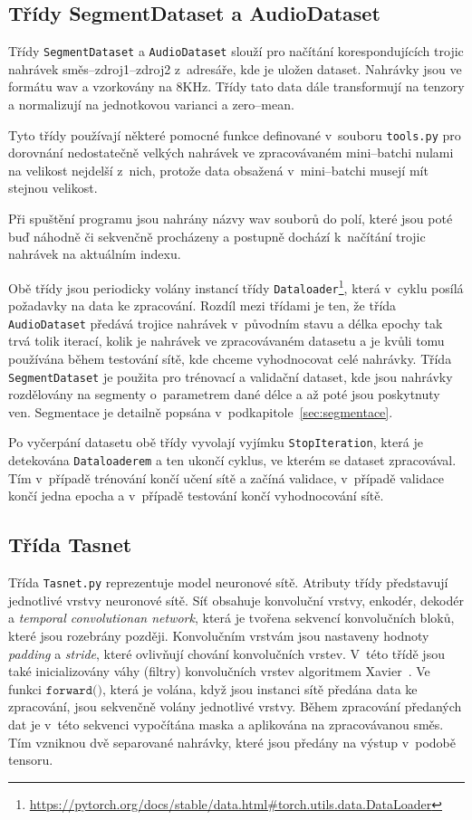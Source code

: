 \subsection*{Třídy SegmentDataset a AudioDataset}
Třídy \texttt{SegmentDataset} a \texttt{AudioDataset} slouží pro načítání korespondujících trojic nahrávek směs--zdroj1--zdroj2 z~adresáře, kde je uložen dataset. Nahrávky jsou ve formátu wav a vzorkovány na 8KHz. Třídy tato data dále transformují na tenzory a normalizují na jednotkovou varianci a zero--mean. 

Tyto třídy používají některé pomocné funkce definované v~souboru \texttt{tools.py} pro dorovnání nedostatečně velkých nahrávek ve zpracovávaném mini--batchi nulami na velikost nejdelší z~nich, protože data obsažená v~mini--batchi musejí mít stejnou velikost.

Při spuštění programu jsou nahrány názvy wav souborů do polí, které jsou poté buď náhodně či sekvenčně procházeny a postupně dochází k~načítání trojic nahrávek na aktuálním indexu. 

Obě třídy jsou periodicky volány instancí třídy \texttt{Dataloader}\footnote{\url{https://pytorch.org/docs/stable/data.html\#torch.utils.data.DataLoader}}, která v~cyklu posílá požadavky na data ke zpracování. Rozdíl mezi třídami je ten, že třída \texttt{AudioDataset} předává trojice nahrávek v~původním stavu a délka epochy tak trvá tolik iterací, kolik je nahrávek ve zpracovávaném datasetu a je kvůli tomu používána během testování sítě, kde chceme vyhodnocovat celé nahrávky. Třída \texttt{SegmentDataset} je použita pro trénovací a validační dataset, kde jsou nahrávky rozdělovány na segmenty o~parametrem dané délce a až poté jsou poskytnuty ven. Segmentace je detailně popsána v~podkapitole~\ref{sec:segmentace}.

Po vyčerpání datasetu obě třídy vyvolají vyjímku \texttt{StopIteration}, která je detekována \texttt{Dataloaderem} a ten ukončí cyklus, ve kterém se dataset zpracovával. Tím v~případě trénování končí učení sítě a začíná validace, v~případě validace končí jedna epocha a v~případě testování končí vyhodnocování sítě.


\subsection*{Třída Tasnet}
Třída \texttt{Tasnet.py} reprezentuje model neuronové sítě. Atributy třídy představují jednotlivé vrstvy neuronové sítě. Síť obsahuje konvoluční vrstvy, enkodér, dekodér a \textit{temporal convolutionan network}, která je tvořena sekvencí konvolučních bloků, které jsou rozebrány později. Konvolučním vrstvám jsou nastaveny hodnoty \textit{padding} a \textit{stride}, které ovlivňují chování konvolučních vrstev. V~této třídě jsou také inicializovány váhy (filtry) konvolučních vrstev algoritmem Xavier~\cite{pmlr-v9-glorot10a}. Ve funkci $\texttt{forward()}$, která je volána, když jsou instanci sítě předána data ke zpracování, jsou sekvenčně volány jednotlivé vrstvy. Během zpracování předaných dat je v~této sekvenci vypočítána maska a aplikována na zpracovávanou směs. Tím vzniknou dvě separované nahrávky, které jsou předány na výstup v~podobě tensoru. 


